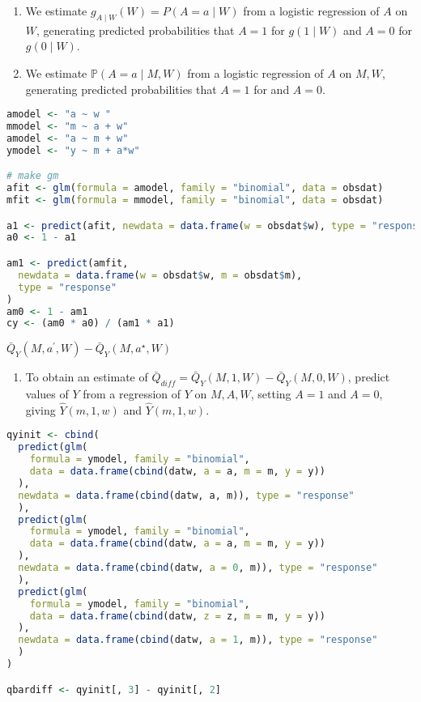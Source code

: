 \documentclass[
  12pt,
]{book}
\providecommand{\tightlist}{%
  \setlength{\itemsep}{0pt}\setlength{\parskip}{0pt}}
\theoremstyle{definition}
\theoremstyle{definition}
\theoremstyle{definition}
\renewcommand{\P}{\mathbb{P}}
\newcommand{\1}{\mathbbm{1}}
\begin{document}
\begin{enumerate}
\def\labelenumi{\arabic{enumi}.}
\tightlist
\item
  We estimate \(g_{A \mid W}(W)=P(A=a \mid W)\) from a logistic regression of
  \(A\) on \(W\), generating predicted probabilities that \(A=1\) for \(g(1 \mid W)\)
  and \(A=0\) for \(g(0 \mid W)\).\\
\item
  We estimate \(\P(A=a \mid M, W)\) from a logistic regression of \(A\) on \(M, W\),
  generating predicted probabilities that \(A=1\) for and \(A=0\).
\end{enumerate}

\begin{lstlisting}[language=R]
amodel <- "a ~ w "
mmodel <- "m ~ a + w"
amodel <- "a ~ m + w"
ymodel <- "y ~ m + a*w"

# make gm
afit <- glm(formula = amodel, family = "binomial", data = obsdat)
mfit <- glm(formula = mmodel, family = "binomial", data = obsdat)

a1 <- predict(afit, newdata = data.frame(w = obsdat$w), type = "response")
a0 <- 1 - a1

am1 <- predict(amfit,
  newdata = data.frame(w = obsdat$w, m = obsdat$m),
  type = "response"
)
am0 <- 1 - am1
cy <- (am0 * a0) / (am1 * a1)
\end{lstlisting}

\(\bar{Q}_Y(M,a^\prime,W) - \bar{Q}_Y(M,a^\star,W)\)

\begin{enumerate}
\def\labelenumi{\arabic{enumi}.}
\setcounter{enumi}{2}
\tightlist
\item
  To obtain an estimate of \(\bar{Q}_{diff} = \bar{Q}_Y(M,1,W) - \bar{Q}_Y(M,0,W)\), predict values of \(Y\) from a regression of \(Y\) on \(M,A,W\),
  setting \(A=1\) and \(A=0\), giving \(\hat{Y}(m, 1, w)\) and \(\hat{Y}(m, 1, w)\).
\end{enumerate}

\begin{lstlisting}[language=R]
qyinit <- cbind(
  predict(glm(
    formula = ymodel, family = "binomial",
    data = data.frame(cbind(datw, a = a, m = m, y = y))
  ),
  newdata = data.frame(cbind(datw, a, m)), type = "response"
  ),
  predict(glm(
    formula = ymodel, family = "binomial",
    data = data.frame(cbind(datw, a = a, m = m, y = y))
  ),
  newdata = data.frame(cbind(datw, a = 0, m)), type = "response"
  ),
  predict(glm(
    formula = ymodel, family = "binomial",
    data = data.frame(cbind(datw, z = z, m = m, y = y))
  ),
  newdata = data.frame(cbind(datw, a = 1, m)), type = "response"
  )
)

qbardiff <- qyinit[, 3] - qyinit[, 2]
\end{lstlisting}
\end{document}

